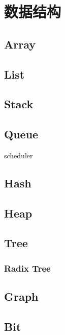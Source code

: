 \chapter{数据结构}

\section{Array}

\section{List}

\section{Stack}

\section{Queue}

scheduler

\section{Hash}

\section{Heap}

\section{Tree}

\subsection{Radix Tree}

\section{Graph}

\section{Bit}
